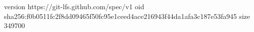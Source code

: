 version https://git-lfs.github.com/spec/v1
oid sha256:f0b0511fc2f8dd09465f50fc95e1ceed4ace216943f44da1afa3c187e53fa945
size 349700
